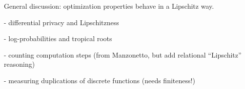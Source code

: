 


General discussion: optimization properties behave in a Lipschitz way.


- differential privacy and Lipschitzness


- log-probabilities and tropical roots 


- counting computation steps (from Manzonetto, but add relational ``Lipschitz'' reasoning)


- measuring duplications of discrete functions (needs finiteness!)



